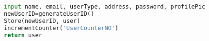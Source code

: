 \begin{lstlisting}[language=Python , caption=Python example]
input name, email, userType, address, password, profilePic
newUserID=generateUserID()
Store(newUserID, user)
incrementCounter('UserCounterNO')
return user
\end{lstlisting}